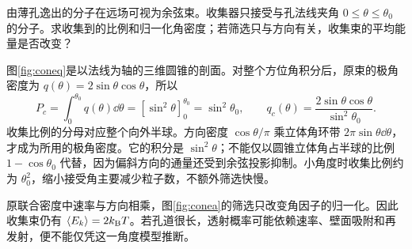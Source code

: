 \begin{exercise}[束流的角分布与圆锥筛选]
由薄孔逸出的分子在远场可视为余弦束。收集器只接受与孔法线夹角 $0\le\theta\le\theta_0$ 的分子。求收集到的比例和归一化角密度；若筛选只与方向有关，收集束的平均能量是否改变？
\end{exercise}
\begin{solution}
图\ref{fig:coneq}是以法线为轴的三维圆锥的剖面。对整个方位角积分后，原束的极角密度为 $q(\theta)=2\sin\theta\cos\theta$，所以
\[
 P_c=\int_0^{\theta_0}q(\theta)\dd\theta
=[\sin^2\theta]_0^{\theta_0}=\sin^2\theta_0,
 \qquad q_c(\theta)=\frac{2\sin\theta\cos\theta}{\sin^2\theta_0}.
\]
收集比例的分母对应整个向外半球。方向密度 $\cos\theta/\pi$ 乘立体角环带 $2\pi\sin\theta\dd\theta$，才成为所用的极角密度。它的积分是 $\sin^2\theta$；不能仅以圆锥立体角占半球的比例 $1-\cos\theta_0$ 代替，因为偏斜方向的通量还受到余弦投影抑制。小角度时收集比例约为 $\theta_0^2$，缩小接受角主要减少粒子数，不额外筛选快慢。

原联合密度中速率与方向相乘，图\ref{fig:conea}的筛选只改变角因子的归一化。因此收集束仍有 $\langle E_k\rangle=2k_{\mathrm B} T$。若孔道很长，透射概率可能依赖速率、壁面吸附和再发射，便不能仅凭这一角度模型推断。
\end{solution}

